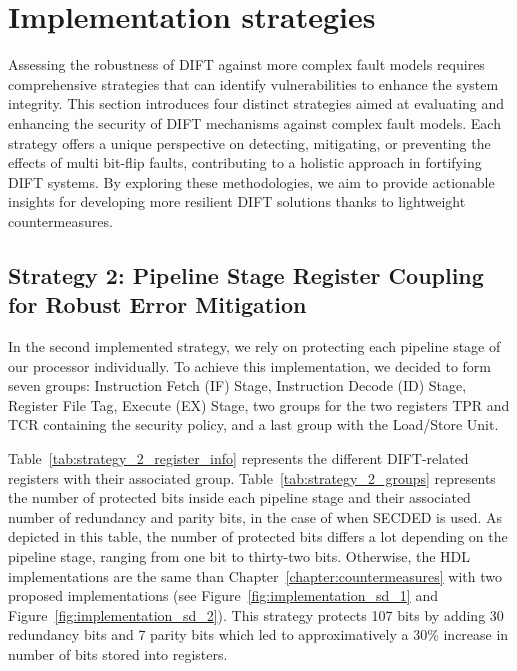 \section{Implementation strategies}
\label{section:chap6_implem_strategies}

Assessing the robustness of DIFT against more complex fault models requires comprehensive strategies that can identify vulnerabilities to enhance the system integrity. This section introduces four distinct strategies aimed at evaluating and enhancing the security of DIFT mechanisms against complex fault models. Each strategy offers a unique perspective on detecting, mitigating, or preventing the effects of multi bit-flip faults, contributing to a holistic approach in fortifying DIFT systems. By exploring these methodologies, we aim to provide actionable insights for developing more resilient DIFT solutions thanks to lightweight countermeasures.

\subsection{Strategy 2: Pipeline Stage Register Coupling for Robust Error Mitigation}

In the second implemented strategy, we rely on protecting each pipeline stage of our processor individually. To achieve this implementation, we decided to form seven groups: Instruction Fetch (IF) Stage, Instruction Decode (ID) Stage, Register File Tag, Execute (EX) Stage, two groups for the two registers TPR and TCR containing the security policy, and a last group with the Load/Store Unit. 

Table~\ref{tab:strategy_2_register_info} represents the different DIFT-related registers with their associated group.
Table~\ref{tab:strategy_2_groups} represents the number of protected bits inside each pipeline stage and their associated number of redundancy and parity bits, in the case of when SECDED is used. As depicted in this table, the number of protected bits differs a lot depending on the pipeline stage, ranging from one bit to thirty-two bits.
Otherwise, the HDL implementations are the same than Chapter~\ref{chapter:countermeasures} with two proposed implementations (see Figure~\ref{fig:implementation_sd_1} and Figure~\ref{fig:implementation_sd_2}). This strategy protects 107 bits by adding 30 redundancy bits and 7 parity bits which led to approximatively a 30\% increase in number of bits stored into registers.

